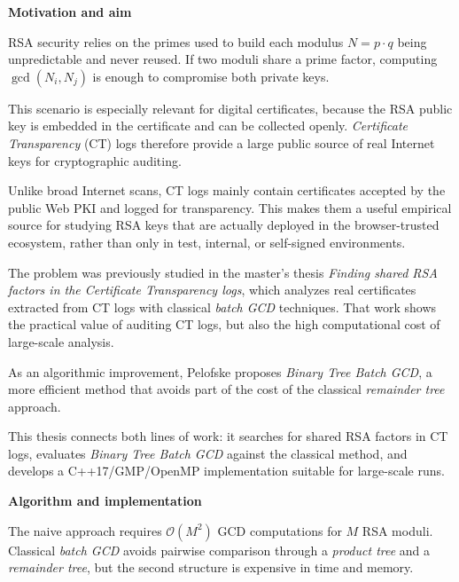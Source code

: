 \documentclass{article}
\newlength{\postercolwidth}
\newenvironment{posterblock}[1]
{
  \vspace{1.0cm}
  \noindent
  \begin{minipage}{\postercolwidth}
  \colorbox{posterblue}{%
    \parbox{\dimexpr\postercolwidth-2\fboxsep\relax}{%
      \color{white}\bfseries\fontsize{32}{38}\selectfont #1
    }%
  }
  \par\vspace{0.22cm}
  \color{postergray}
  \fontsize{29}{35}\selectfont
}
{
  \end{minipage}
  \par
}
\begin{document}
\noindent
\begin{minipage}[t]{\postercolwidth}

\begin{posterblock}{Motivation and aim}
RSA security relies on the primes used to build each modulus
$N=p\cdot q$ being unpredictable and never reused. If two moduli share a prime
factor, computing $\gcd(N_i,N_j)$ is enough to compromise both private keys.

This scenario is especially relevant for digital certificates, because the RSA
public key is embedded in the certificate and can be collected openly.
\textit{Certificate Transparency} (CT) logs therefore provide a large public
source of real Internet keys for cryptographic auditing.

Unlike broad Internet scans, CT logs mainly contain certificates accepted by the
public Web PKI and logged for transparency. This makes them a useful empirical
source for studying RSA keys that are actually deployed in the browser-trusted
ecosystem, rather than only in test, internal, or self-signed environments.

The problem was previously studied in the master's thesis \textit{Finding
shared RSA factors in the Certificate Transparency logs}, which analyzes real
certificates extracted from CT logs with classical \textit{batch GCD}
techniques. That work shows the practical value of auditing CT logs, but also
the high computational cost of large-scale analysis.

As an algorithmic improvement, Pelofske proposes \textit{Binary Tree Batch GCD},
a more efficient method that avoids part of the cost of the classical
\textit{remainder tree} approach.

This thesis connects both lines of work: it searches for shared RSA factors in
CT logs, evaluates \textit{Binary Tree Batch GCD} against the classical method,
and develops a C++17/GMP/OpenMP implementation suitable for large-scale runs.
\end{posterblock}

\begin{posterblock}{Algorithm and implementation}
The naive approach requires $\mathcal{O}(M^2)$ GCD computations for $M$ RSA
moduli. Classical \textit{batch GCD} avoids pairwise comparison through a
\textit{product tree} and a \textit{remainder tree}, but the second structure is
expensive in time and memory.


\end{posterblock}
\end{minipage}
\end{document}
